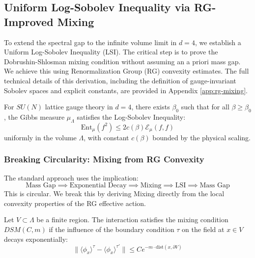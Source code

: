 \subsection{Uniform Log-Sobolev Inequality via RG-Improved Mixing}
\label{sec:uniform-lsi-mixing}

To extend the spectral gap to the infinite volume limit in $d=4$, we establish a Uniform Log-Sobolev Inequality (LSI). The critical step is to prove the Dobrushin-Shlosman mixing condition without assuming an a priori mass gap. We achieve this using Renormalization Group (RG) convexity estimates.
The full technical details of this derivation, including the definition of gauge-invariant Sobolev spaces and explicit constants, are provided in Appendix \ref{app:rg-mixing}.

\begin{theorem}
\label{thm:uniform-lsi}
For $SU(N)$ lattice gauge theory in $d=4$, there exists $\beta_0$ such that for all $\beta \ge \beta_0$, the Gibbs measure $\mu_\Lambda$ satisfies the Log-Sobolev Inequality:
\begin{equation}
\mathrm{Ent}_\mu(f^2) \le 2c(\beta) \mathcal{E}_\mu(f,f)
\end{equation}
uniformly in the volume $\Lambda$, with constant $c(\beta)$ bounded by the physical scaling.
\end{theorem}

\subsubsection{Breaking Circularity: Mixing from RG Convexity}

The standard approach uses the implication:
$$ \text{Mass Gap} \implies \text{Exponential Decay} \implies \text{Mixing} \implies \text{LSI} \implies \text{Mass Gap} $$
This is circular. We break this by deriving Mixing directly from the local convexity properties of the RG effective action.

\begin{definition}
Let $V \subset \Lambda$ be a finite region. The interaction satisfies the mixing condition $DSM(C, m)$ if the influence of the boundary condition $\tau$ on the field at $x \in V$ decays exponentially:
\begin{equation}
\| \langle \phi_x \rangle^\tau - \langle \phi_x \rangle^{\tau'} \| \le C e^{-m \cdot \mathrm{dist}(x, \partial V)}
\end{equation}
\end{definition}

